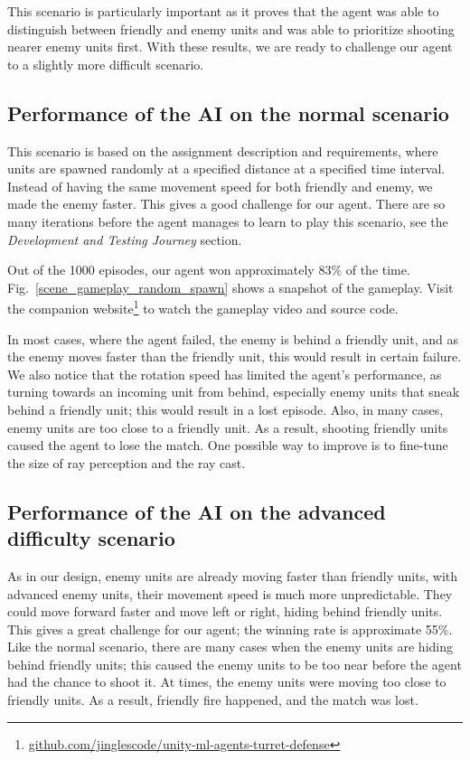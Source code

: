\documentclass[conference]{IEEEtran}
\begin{document}
This scenario is particularly important as it proves that the agent was able to distinguish between friendly and enemy units and was able to prioritize shooting nearer enemy units first. With these results, we are ready to challenge our agent to a slightly more difficult scenario.

\subsection{Performance of the AI on the normal scenario}

This scenario is based on the assignment description and requirements, where units are spawned randomly at a specified distance at a specified time interval. Instead of having the same movement speed for both friendly and enemy, we made the enemy faster. This gives a good challenge for our agent. There are so many iterations before the agent manages to learn to play this scenario, see the \textit{Development and Testing Journey} section.

Out of the 1000 episodes, our agent won approximately 83\% of the time. Fig.~\ref{scene_gameplay_random_spawn} shows a snapshot of the gameplay. Visit the companion website\footnote{\href{https://github.com/jinglescode/unity-ml-agents-turret-defense}{github.com/jinglescode/unity-ml-agents-turret-defense}} to watch the gameplay video and source code. 

In most cases, where the agent failed, the enemy is behind a friendly unit, and as the enemy moves faster than the friendly unit, this would result in certain failure. We also notice that the rotation speed has limited the agent's performance, as turning towards an incoming unit from behind, especially enemy units that sneak behind a friendly unit; this would result in a lost episode. Also, in many cases, enemy units are too close to a friendly unit. As a result, shooting friendly units caused the agent to lose the match. One possible way to improve is to fine-tune the size of ray perception and the ray cast. 

\subsection{Performance of the AI on the advanced difficulty scenario}

As in our design, enemy units are already moving faster than friendly units, with advanced enemy units, their movement speed is much more unpredictable. They could move forward faster and move left or right, hiding behind friendly units. This gives a great challenge for our agent; the winning rate is approximate 55\%. Like the normal scenario, there are many cases when the enemy units are hiding behind friendly units; this caused the enemy units to be too near before the agent had the chance to shoot it. At times, the enemy units were moving too close to friendly units. As a result, friendly fire happened, and the match was lost.
\end{document}
